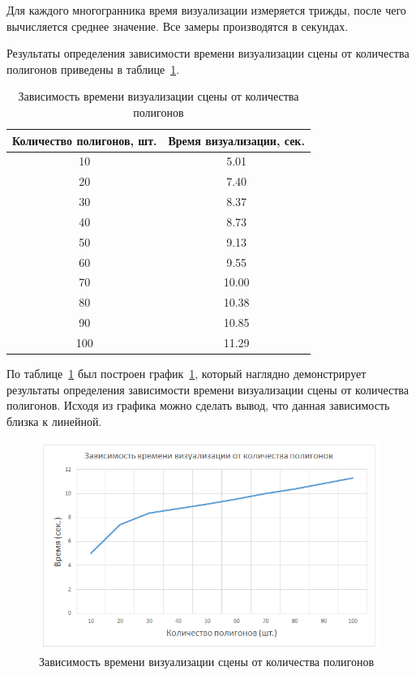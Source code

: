 Для каждого многогранника время визуализации измеряется трижды, после чего вычисляется среднее значение. Все замеры производятся в секундах.

Результаты определения зависимости времени визуализации сцены от количества полигонов приведены в таблице~\ref{tbl:research1}.

\begin{table}[h]
	\small
	\centering
	\caption{Зависимость времени визуализации сцены от количества полигонов}
	\begin{tabular}{|c|c|}
		\hline
		\textbf{Количество полигонов, шт.} & \textbf{Время визуализации, сек.} \\
		\hline
		10  & 5.01 \\
		20  & 7.40 \\
		30  & 8.37 \\
		40  & 8.73 \\
		50  & 9.13 \\
		60  & 9.55 \\
		70  & 10.00 \\
		80  & 10.38 \\
		90  & 10.85 \\
		100 & 11.29 \\
		\hline
	\end{tabular}
	\label{tbl:research1}
\end{table}

По таблице~\ref{tbl:research1} был построен график~\ref{fig:research1}, который наглядно демонстрирует результаты определения зависимости времени визуализации сцены от количества полигонов. Исходя из графика можно сделать вывод, что данная зависимость близка к линейной.

\begin{figure}[h] 
	\centering
	\includegraphics[width=0.99\textwidth]{images/research1.png}
	\caption{Зависимость времени визуализации сцены от количества полигонов} 
	\label{fig:research1} 
\end{figure}

